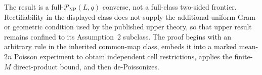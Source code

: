 The result is a full-\(\mathcal P_{\mathrm{NP}}(L,q)\) converse, not a full-class two-sided frontier.  Rectifiability in the displayed class does not supply the additional uniform Gram or geometric condition used by the published upper theory, so that upper result remains confined to its Assumption~2 subclass.  The proof begins with an arbitrary rule in the inherited common-map class, embeds it into a marked mean-\(2n\) Poisson experiment to obtain independent cell restrictions, applies the finite-\(M\) direct-product bound, and then de-Poissonizes.